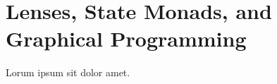 \section{Lenses, State Monads, and Graphical Programming}


Lorum ipsum sit dolor amet.  \lipsum[2-4]